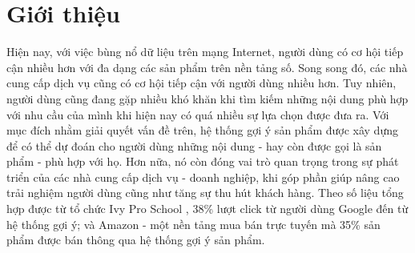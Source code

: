 \chapter{Giới thiệu}
\label{Chapter1}
\graphicspath{{Chapter1/Chapter1Figs}}






Hiện nay, với việc bùng nổ dữ liệu trên mạng Internet, người dùng có cơ hội tiếp cận
nhiều hơn với đa dạng các sản phẩm trên nền tảng số. Song song đó,
các nhà cung cấp dịch vụ cũng có cơ hội tiếp cận với người dùng nhiều hơn. %
Tuy nhiên, người dùng cũng đang gặp nhiều khó khăn khi tìm kiếm những nội dung phù hợp với nhu cầu của mình khi hiện nay có quá nhiều sự lựa chọn được đưa ra.
Với mục đích nhằm giải quyết vấn đề trên, hệ thống gợi ý sản phẩm được xây dựng để có thể dự đoán cho người dùng những nội dung - hay còn được gọi là sản phẩm - phù hợp với họ.
Hơn nữa, nó còn đóng vai trò quan trọng trong sự phát triển của các nhà cung cấp dịch vụ - doanh nghiệp,
khi góp phần giúp nâng cao trải nghiệm người dùng cũng như tăng sự thu hút khách hàng. Theo số liệu tổng hợp được từ tổ chức Ivy Pro School \cite{ivy}, 
38\% lượt click từ người dùng Google đến từ hệ thống gợi ý; và 
Amazon - một nền tảng mua bán trực tuyến mà 35\% sản phẩm được bán thông qua hệ thống gợi ý sản phẩm.

